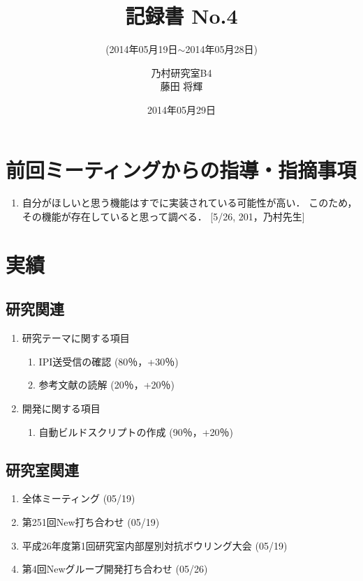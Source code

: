 \documentclass[fleqn, 14pt]{extarticle}
\subtitle{(2014年05月19日$\sim$2014年05月28日)}
\author{乃村研究室B4\\藤田 将輝}
\date{2014年05月29日}
\title{記録書 No.4}
\begin{document}
\maketitle




\section{前回ミーティングからの指導・指摘事項}
\label{sec-1}
\begin{enumerate}
\item 自分がほしいと思う機能はすでに実装されている可能性が高い．
このため，その機能が存在していると思って調べる．
\newline
\hfill
[5/26, 201，乃村先生]
\end{enumerate}




\section{実績}
\label{sec-2}


\subsection{研究関連}
\label{sec-2-1}
\begin{enumerate}
\item 研究テーマに関する項目
\hfill
\label{enum-research1}
\begin{enumerate}

\item IPI送受信の確認
\hfill
\label{enum-1-A}
(80％，+30％)
\item 参考文献の読解
\hfill
\label{enum-1-B}
(20％，+20％)
\end{enumerate}
\item 開発に関する項目
\hfill
\label{enum-research2}
\begin{enumerate}

\item 自動ビルドスクリプトの作成
\hfill
\label{enum-2-A}
(90％，+20％)
\end{enumerate}
\end{enumerate}


\subsection{研究室関連}
\label{sec-2-2}

\begin{enumerate}
\item 全体ミーティング
\hfill
\label{enum-laboratory1}
(05/19)
\item 第251回New打ち合わせ
\hfill
\label{enum-laboratory2}
(05/19)
\item 平成26年度第1回研究室内部屋別対抗ボウリング大会
\hfill
\label{enum-laboratory3}
(05/19)
\item 第4回Newグループ開発打ち合わせ
\hfill
\label{enum-laboratory4}
(05/26)
\end{enumerate}
\end{document}
